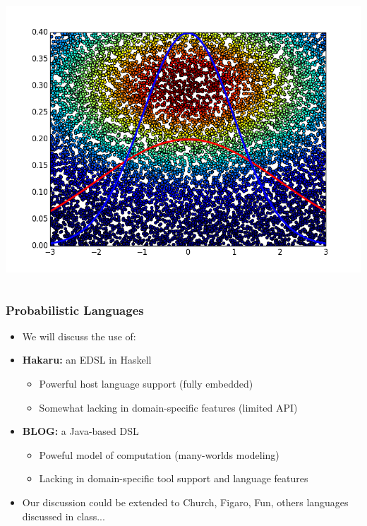 \begin{frame}
\begin{columns}
  \includegraphics[width=\columnwidth]{metropolis_hastings.png}
\end{columns}
\end{frame}

\begin{frame} \frametitle{Probabilistic Languages}
\begin{itemize}
\item We will discuss the use of:
\item {\bf Hakaru:} an EDSL in Haskell
  \begin{itemize}
  \item Powerful host language support (fully embedded)
  \item Somewhat lacking in domain-specific features (limited API)
  \end{itemize}
\item {\bf BLOG:} a Java-based DSL
  \begin{itemize}
  \item Poweful model of computation (many-worlds modeling)
  \item Lacking in domain-specific tool support and language features
  \end{itemize}
\item Our discussion could be extended to Church, Figaro,
      Fun, others languages discussed in class...
\end{itemize}
\end{frame}

